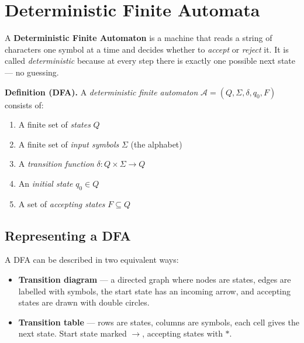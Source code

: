 \documentclass[11pt, a4paper]{article}
\theoremstyle{definition}
\theoremstyle{remark}
\newcommand{\dfa}{\mathcal{A}}
\begin{document}
%
%

\clearpage
\section{Deterministic Finite Automata}

A \textbf{Deterministic Finite Automaton} is a machine that reads a string of characters one
symbol at a time and decides whether to \emph{accept} or \emph{reject} it.  It is called
\emph{deterministic} because at every step there is exactly one possible next state ---
no guessing.

\begin{defbox}
\textbf{Definition (DFA).}  A \emph{deterministic finite automaton}
$\dfa=(Q,\Sigma,\delta,q_0,F)$ consists of:
\begin{enumerate}[leftmargin=*, itemsep=2pt]
  \item A finite set of \emph{states} $Q$
  \item A finite set of \emph{input symbols} $\Sigma$ (the alphabet)
  \item A \emph{transition function} $\delta\colon Q\times\Sigma\to Q$
  \item An \emph{initial state} $q_0\in Q$
  \item A set of \emph{accepting states} $F\subseteq Q$
\end{enumerate}
\end{defbox}

\subsection{Representing a DFA}

A DFA can be described in two equivalent ways:
\begin{itemize}
  \item \textbf{Transition diagram} --- a directed graph where nodes are states, edges are
        labelled with symbols, the start state has an incoming arrow, and accepting states are
        drawn with double circles.
  \item \textbf{Transition table} --- rows are states, columns are symbols, each cell gives
        the next state.  Start state marked $\to$, accepting states with $*$.
\end{itemize}
\end{document}
